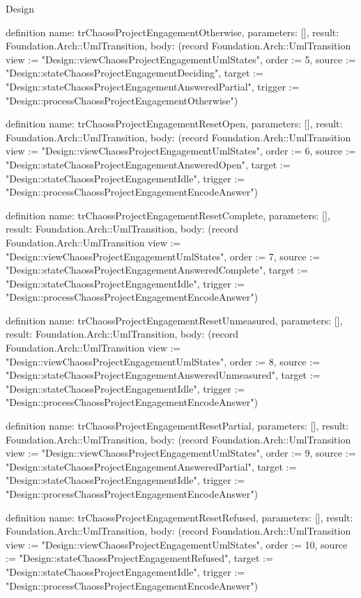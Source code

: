 \begin{lexlean}{Design}
\begin{semanticmodule}
definition{
  name: trChaossProjectEngagementOtherwise,
  parameters: [],
  result: Foundation.Arch::UmlTransition,
  body: (record Foundation.Arch::UmlTransition {view := "Design::viewChaossProjectEngagementUmlStates", order := 5, source := "Design::stateChaossProjectEngagementDeciding", target := "Design::stateChaossProjectEngagementAnsweredPartial", trigger := "Design::processChaossProjectEngagementOtherwise"})
}

definition{
  name: trChaossProjectEngagementResetOpen,
  parameters: [],
  result: Foundation.Arch::UmlTransition,
  body: (record Foundation.Arch::UmlTransition {view := "Design::viewChaossProjectEngagementUmlStates", order := 6, source := "Design::stateChaossProjectEngagementAnsweredOpen", target := "Design::stateChaossProjectEngagementIdle", trigger := "Design::processChaossProjectEngagementEncodeAnswer"})
}

definition{
  name: trChaossProjectEngagementResetComplete,
  parameters: [],
  result: Foundation.Arch::UmlTransition,
  body: (record Foundation.Arch::UmlTransition {view := "Design::viewChaossProjectEngagementUmlStates", order := 7, source := "Design::stateChaossProjectEngagementAnsweredComplete", target := "Design::stateChaossProjectEngagementIdle", trigger := "Design::processChaossProjectEngagementEncodeAnswer"})
}

definition{
  name: trChaossProjectEngagementResetUnmeasured,
  parameters: [],
  result: Foundation.Arch::UmlTransition,
  body: (record Foundation.Arch::UmlTransition {view := "Design::viewChaossProjectEngagementUmlStates", order := 8, source := "Design::stateChaossProjectEngagementAnsweredUnmeasured", target := "Design::stateChaossProjectEngagementIdle", trigger := "Design::processChaossProjectEngagementEncodeAnswer"})
}

definition{
  name: trChaossProjectEngagementResetPartial,
  parameters: [],
  result: Foundation.Arch::UmlTransition,
  body: (record Foundation.Arch::UmlTransition {view := "Design::viewChaossProjectEngagementUmlStates", order := 9, source := "Design::stateChaossProjectEngagementAnsweredPartial", target := "Design::stateChaossProjectEngagementIdle", trigger := "Design::processChaossProjectEngagementEncodeAnswer"})
}

definition{
  name: trChaossProjectEngagementResetRefused,
  parameters: [],
  result: Foundation.Arch::UmlTransition,
  body: (record Foundation.Arch::UmlTransition {view := "Design::viewChaossProjectEngagementUmlStates", order := 10, source := "Design::stateChaossProjectEngagementRefused", target := "Design::stateChaossProjectEngagementIdle", trigger := "Design::processChaossProjectEngagementEncodeAnswer"})
}


\end{semanticmodule}
\end{lexlean}
